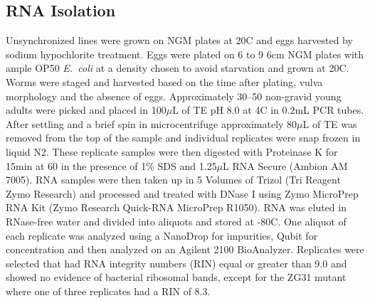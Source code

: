\documentclass[10pt, onecolumn]{article}
\newcommand{\ecol}{\emph{E.~coli}}
\begin{document}
\subsection*{RNA Isolation}
Unsynchronized lines were grown on NGM plates at 20C and eggs harvested by
sodium hypochlorite treatment. Eggs were plated on 6 to 9 6cm NGM plates
with ample OP50 \ecol{} at a density chosen to avoid starvation and grown at
20\degree{}C.  Worms were staged and harvested based on the time after plating,
vulva morphology and the absence of eggs.  Approximately 30--50 non-gravid young
adults were picked and placed in 100$\mu$L of TE pH 8.0 at 4\degree{}C in
$0.2$mL PCR tubes.   After settling and a brief spin in microcentrifuge approximately
$80\mu$L of TE was removed from the top of the sample and individual replicates
were snap frozen in liquid N2. These replicate samples were then digested with
Proteinase K for 15min at 60\degree{} in the presence of 1\% SDS and 1.25$\mu$L
RNA Secure (Ambion AM 7005). RNA samples were then taken up in 5 Volumes of
Trizol (Tri Reagent Zymo Research) and processed and treated with DNase I using
Zymo MicroPrep RNA Kit (Zymo Research Quick-RNA MicroPrep  R1050).
RNA was eluted in RNase-free water and divided into aliquots and stored at -80\degree{}C.
One aliquot of each replicate was analyzed using a NanoDrop for impurities,
Qubit for concentration and then analyzed on an Agilent 2100 BioAnalyzer.
Replicates were selected that had RNA integrity numbers (RIN) equal or greater
than 9.0 and showed no evidence of bacterial ribosomal bands, except for the
ZG31 mutant where one of three replicates had a RIN of 8.3.
\end{document}
